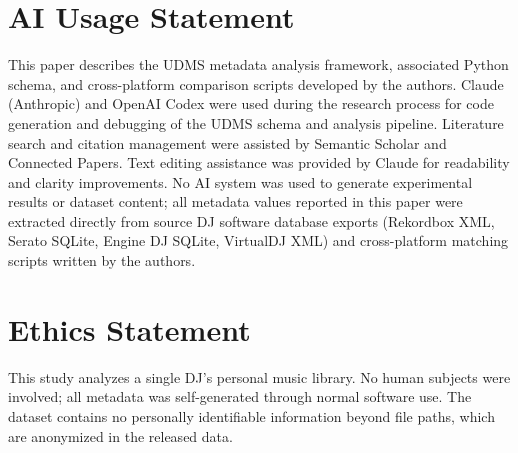 \documentclass[letterpaper,10pt]{article}
\begin{document}



\section{AI Usage Statement}
This paper describes the UDMS metadata analysis framework, associated Python schema, and cross-platform comparison scripts developed by the authors. Claude (Anthropic) and OpenAI Codex were used during the research process for code generation and debugging of the UDMS schema and analysis pipeline. Literature search and citation management were assisted by Semantic Scholar and Connected Papers. Text editing assistance was provided by Claude for readability and clarity improvements. No AI system was used to generate experimental results or dataset content; all metadata values reported in this paper were extracted directly from source DJ software database exports (Rekordbox XML, Serato SQLite, Engine DJ SQLite, VirtualDJ XML) and cross-platform matching scripts written by the authors.

\section{Ethics Statement}
This study analyzes a single DJ's personal music library. No human subjects were involved; all metadata was self-generated through normal software use. The dataset contains no personally identifiable information beyond file paths, which are anonymized in the released data.
\end{document}
